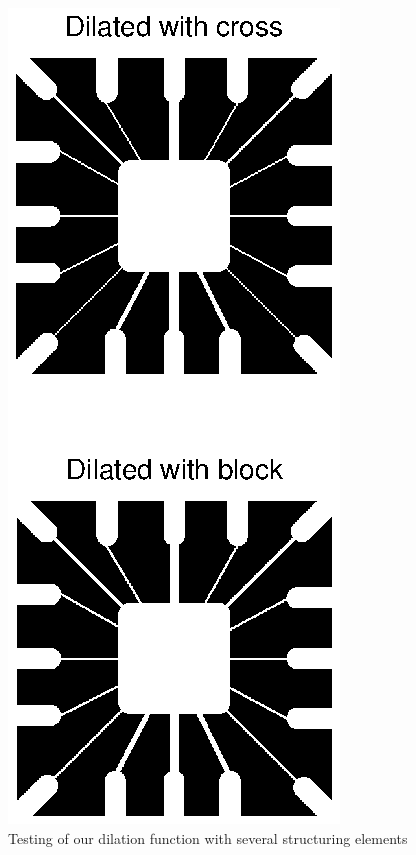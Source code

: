 \begin{figure}[htb]
 \centering
 \includegraphics[width=\linewidth]{dilation.eps}
 \caption{Testing of our dilation function with several structuring elements}
 \label{fig:dilation}
\end{figure}

